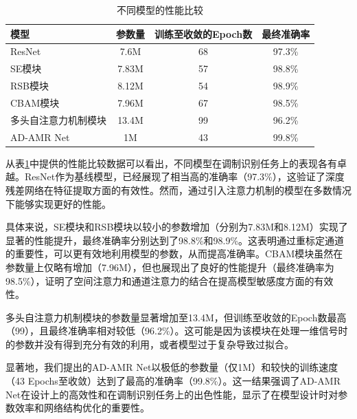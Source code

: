 \begin{table}[ht]
    \centering
    \caption{不同模型的性能比较}
    \label{tab:model_comparison}
    \begin{tabular}{lccc}
    \hline
    \textbf{模型}          & \textbf{参数量} & \textbf{训练至收敛的Epoch数} & \textbf{最终准确率} \\ \hline
    ResNet                 & 7.6M             & 68                           & 97.3\%              \\
    SE模块                 & 7.83M             & 57                           & 98.8\%              \\
    RSB模块                & 8.12M             & 54                           & 98.9\%              \\
    CBAM模块               & 7.96M           & 67                           & 98.5\%              \\
    多头自注意力机制模块 & 13.4M             & 99                          & 96.2\%              \\
    AD-AMR Net             & 1M            & 43                           & 99.8\%              \\ \hline
    \end{tabular}
    \label{tab:model_comparison_single_wideband}
\end{table}
    
从表\ref{tab:model_comparison_single_wideband}中提供的性能比较数据可以看出，不同模型在调制识别任务上的表现各有卓越。ResNet作为基线模型，已经展现了相当高的准确率（97.3\%），这验证了深度残差网络在特征提取方面的有效性。然而，通过引入注意力机制的模型在多数情况下能够实现更好的性能。

具体来说，SE模块和RSB模块以较小的参数增加（分别为7.83M和8.12M）实现了显著的性能提升，最终准确率分别达到了98.8\%和98.9\%。这表明通过重标定通道的重要性，可以更有效地利用模型的参数，从而提高准确率。CBAM模块虽然在参数量上仅略有增加（7.96M），但也展现出了良好的性能提升（最终准确率为98.5\%），证明了空间注意力和通道注意力的结合在提高模型敏感度方面的有效性。

多头自注意力机制模块的参数量显著增加至13.4M，但训练至收敛的Epoch数最高（99），且最终准确率相对较低（96.2\%）。这可能是因为该模块在处理一维信号时的参数并没有得到充分有效的利用，或者模型过于复杂导致过拟合。

显著地，我们提出的AD-AMR Net以极低的参数量（仅1M）和较快的训练速度（43 Epochs至收敛）达到了最高的准确率（99.8\%）。这一结果强调了AD-AMR Net在设计上的高效性和在调制识别任务上的出色性能，显示了在模型设计时对参数效率和网络结构优化的重要性。

